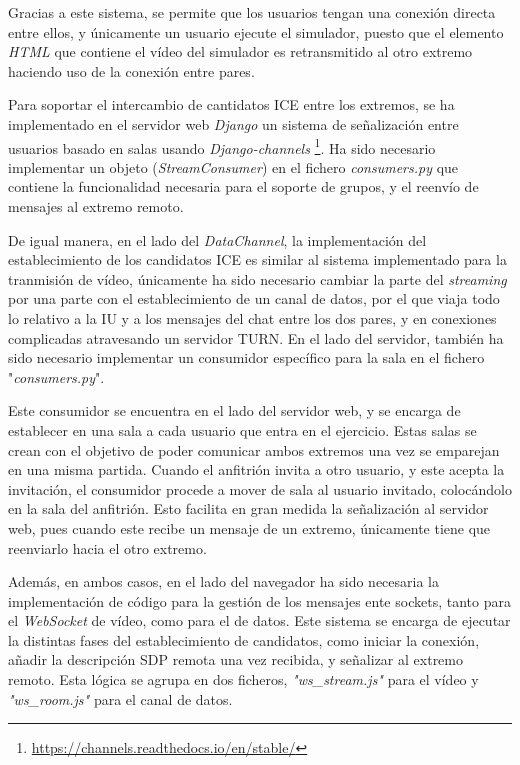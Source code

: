 \documentclass[a4paper, 12pt]{book}
\begin{document}
Gracias a este sistema, se permite que los usuarios tengan una conexión directa entre ellos, y únicamente un usuario ejecute el simulador, puesto que el elemento \emph{HTML} que contiene el vídeo del simulador es retransmitido al otro extremo haciendo uso de la conexión entre pares.

Para soportar el intercambio de cantidatos ICE entre los extremos, se ha implementado en el servidor web \emph{Django} un sistema de señalización entre usuarios basado en salas usando \emph{Django-channels} \footnote{\url{https://channels.readthedocs.io/en/stable/}}. Ha sido necesario implementar un objeto (\emph{StreamConsumer}) en el fichero \emph{consumers.py} que contiene la funcionalidad necesaria para el soporte de grupos, y el reenvío de mensajes al extremo remoto.

De igual manera, en el lado del \emph{DataChannel}, la implementación del establecimiento de los candidatos ICE es similar al sistema implementado para la tranmisión de vídeo, únicamente ha sido necesario cambiar la parte del \emph{streaming} por una parte con el establecimiento de un canal de datos, por el que viaja todo lo relativo a la IU y a los mensajes del chat entre los dos pares, y en conexiones complicadas atravesando un servidor TURN. En el lado del servidor, también ha sido necesario implementar un consumidor específico para la sala en el fichero "\emph{consumers.py}".

Este consumidor se encuentra en el lado del servidor web, y se encarga de establecer en una sala a cada usuario que entra en el ejercicio. Estas salas se crean con el objetivo de poder comunicar ambos extremos una vez se emparejan en una misma partida. Cuando el anfitrión invita a otro usuario, y este acepta la invitación, el consumidor procede a mover de sala al usuario invitado, colocándolo en la sala del anfitrión. Esto facilita en gran medida la señalización al servidor web, pues cuando este recibe un mensaje de un extremo, únicamente tiene que reenviarlo hacia el otro extremo.

Además, en ambos casos, en el lado del navegador ha sido necesaria la implementación de código para la gestión de los mensajes ente sockets, tanto para el \emph{WebSocket} de vídeo, como para el de datos. Este sistema se encarga de ejecutar la distintas fases del establecimiento de candidatos, como iniciar la conexión, añadir la descripción SDP remota una vez recibida, y señalizar al extremo remoto. Esta lógica se agrupa en dos ficheros, \emph{"ws\_stream.js"} para el vídeo y \emph{"ws\_room.js"} para el canal de datos.
\end{document}

